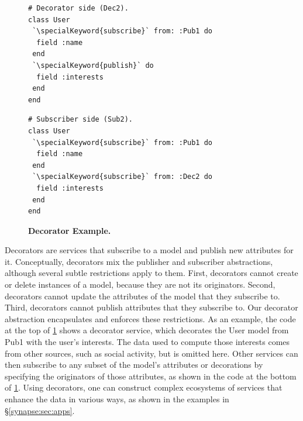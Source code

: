 \begin{figure}
\centering
\begin{minipage}{.8\textwidth}
\begin{minipage}{.4\textwidth}
  \begin{rbox}
\begin{lstlisting}
# Decorator side (Dec2).
class User
 `\specialKeyword{subscribe}` from: :Pub1 do
  field :name
 end
 `\specialKeyword{publish}` do
  field :interests
 end
end
\end{lstlisting}
  \end{rbox}
\end{minipage}
\hspace{1.2in}
\begin{minipage}{.4\textwidth}
  \begin{rbox}
\begin{lstlisting}
# Subscriber side (Sub2).
class User
 `\specialKeyword{subscribe}` from: :Pub1 do
  field :name
 end
 `\specialKeyword{subscribe}` from: :Dec2 do
  field :interests
 end
end
\end{lstlisting}
  \end{rbox}
\end{minipage}
\end{minipage}
\caption{{\bf Decorator Example.}}
\label{synapse:fig:deco}
\end{figure}

Decorators are services that subscribe to a
model and publish new attributes for it.  Conceptually, decorators mix the
publisher and subscriber abstractions, although several subtle restrictions apply to them.  
First, decorators cannot create or delete instances
of a model, because they are not its originators.  Second,
decorators cannot update the attributes of the model that they subscribe
to.  Third, decorators cannot publish attributes that they subscribe to.
Our decorator \mbox{abstraction} encapsulates and enforces these 
restrictions.
As an example, the code at the top of \F\ref{synapse:fig:deco} shows a decorator
service, which decorates the User model from Pub1 with the user's interests.
The data used to compute those interests comes from other sources,
such as social activity, but is omitted here. Other services can then subscribe
to any subset of the model's attributes or decorations by specifying the
originators of those attributes, as shown in the code at the bottom of \F\ref{synapse:fig:deco}.
Using decorators, one can construct complex ecosystems of services
that enhance the data in various ways, as shown in the examples in
\S\ref{synapse:sec:apps}.

